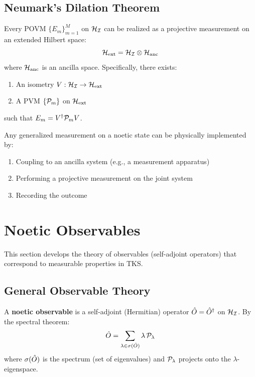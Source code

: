 \subsection{Neumark's Dilation Theorem}

\begin{theorem}
\label{thm:neumark}
Every POVM $\{E_m\}_{m=1}^M$ on $\mathcal{H}_{\mathcal{I}}$ can be realized as a projective measurement on an extended Hilbert space:
\[
\mathcal{H}_{\mathrm{ext}} = \mathcal{H}_{\mathcal{I}} \otimes \mathcal{H}_{\mathrm{anc}}
\]
where $\mathcal{H}_{\mathrm{anc}}$ is an ancilla space. Specifically, there exists:
\begin{enumerate}
  \item An isometry $V: \mathcal{H}_{\mathcal{I}} \to \mathcal{H}_{\mathrm{ext}}$
  \item A PVM $\{\mathcal{P}_m\}$ on $\mathcal{H}_{\mathrm{ext}}$
\end{enumerate}
such that $E_m = V^\dagger \mathcal{P}_m V$.
\end{theorem}

\begin{corollary}
\label{cor:measurement-implementation}
Any generalized measurement on a noetic state can be physically implemented by:
\begin{enumerate}
  \item Coupling to an ancilla system (e.g., a measurement apparatus)
  \item Performing a projective measurement on the joint system
  \item Recording the outcome
\end{enumerate}
\end{corollary}

\section{Noetic Observables}
\label{sec:noetic-observables}

This section develops the theory of observables (self-adjoint operators) that correspond to measurable properties in TKS.

\subsection{General Observable Theory}

\begin{definition}[Observable]
\label{def:observable-v73}
A \textbf{noetic observable} is a self-adjoint (Hermitian) operator $\hat{O} = \hat{O}^\dagger$ on $\mathcal{H}_{\mathcal{I}}$. By the spectral theorem:
\[
\hat{O} = \sum_{\lambda \in \sigma(\hat{O})} \lambda \, \mathcal{P}_\lambda
\]
where $\sigma(\hat{O})$ is the spectrum (set of eigenvalues) and $\mathcal{P}_\lambda$ projects onto the $\lambda$-eigenspace.
\end{definition}

